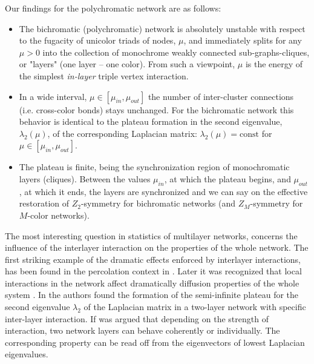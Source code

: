 \documentclass[aps,12pt]{revtex4}
\begin{document}
Our findings for the polychromatic network are as follows:
\begin{itemize}
\item The bichromatic (polychromatic) network is absolutely unstable with respect to the fugacity of unicolor triads of nodes, $\mu$, and immediately splits for any $\mu>0$ into the collection of monochrome weakly connected sub-graphs-cliques, or "layers" (one layer -- one color). From such a viewpoint, $\mu$ is the energy of the simplest \emph{in-layer} triple vertex interaction.
\item In a wide interval, $\mu\in[\mu_{in}, \mu_{out}]$ the number of inter-cluster connections (i.e. cross-color bonds) stays unchanged. For the bichromatic network this behavior is identical to the plateau formation in the second eigenvalue, $\lambda_2(\mu)$, of the corresponding Laplacian matrix: $\lambda_2(\mu)=\mathrm{const}$ for $\mu\in[\mu_{in}, \mu_{out}]$.
\item The plateau is finite, being the synchronization region of monochromatic layers (cliques). Between the values $\mu_{in}$, at which the plateau begins, and $\mu_{out}$, at which it ends, the layers are synchronized and we can say on the effective  restoration  of $Z_2$-symmetry for bichromatic networks (and $Z_M$-symmetry for $M$-color networks).
\end{itemize}

The most interesting question in statistics of multilayer networks, concerns the influence of the interlayer interaction on the properties of the whole network. The first striking example of the dramatic effects enforced by interlayer interactions, has been found in the percolation context in \cite{buldyrev}. Later it was recognized that local interactions in the network affect dramatically diffusion properties of the whole system \cite{arenas, vanmighem, radicchi}. In \cite{arenas} the authors found the formation of the semi-infinite plateau for the second eigenvalue $\lambda_2$ of the Laplacian matrix in a two-layer network with specific inter-layer interaction. If was argued that depending on the strength of interaction, two network layers can behave coherently or individually. The corresponding property can be read off from the eigenvectors of lowest Laplacian eigenvalues.
\end{document}
